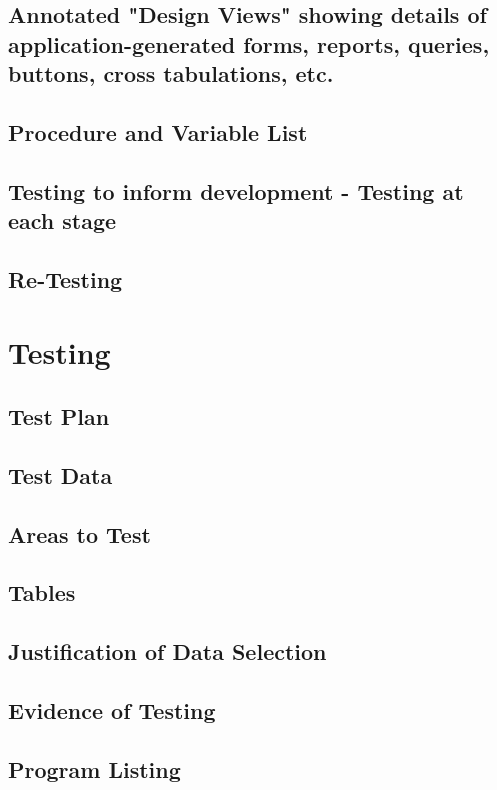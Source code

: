 \documentclass[11pt]{article}
\begin{document}
        \subsection{Annotated "Design Views" showing details of application-generated forms, reports, queries, buttons, cross tabulations, etc.}
        \subsection{Procedure and Variable List}
        \subsection{Testing to inform development - Testing at each stage}
        \subsection{Re-Testing}

    \section{Testing}
        \subsection{Test Plan}
        \subsection{Test Data}
        \subsection{Areas to Test}
        \subsection{Tables}
        \subsection{Justification of Data Selection}
        \subsection{Evidence of Testing}
        \subsection{Program Listing}
    
\end{document}

